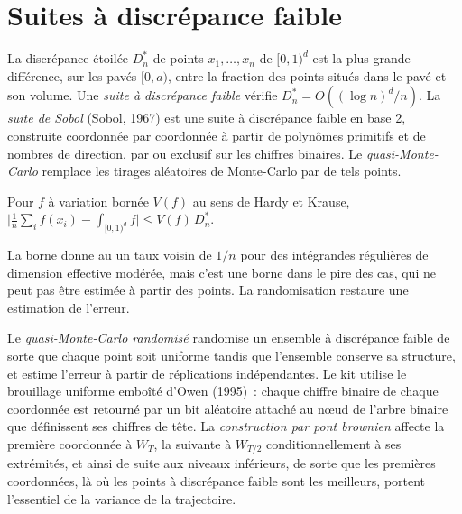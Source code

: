 \section{Suites à discrépance faible}

\begin{definition}\label{def:qm:monte-carlo:qmc}
La discrépance étoilée $D_n^*$ de points $x_1, \dots, x_n$ de $[0, 1)^d$ est la plus grande différence, sur les pavés $[0, a)$, entre la fraction des points situés dans le pavé et son volume. Une \emph{suite à
discrépance faible} vérifie $D_n^* = O((\log n)^d/n)$. La \emph{suite de Sobol} (Sobol, 1967) est une suite à discrépance faible en base 2, construite coordonnée par
coordonnée à partir de polynômes primitifs et de nombres de direction, par ou exclusif sur les chiffres binaires. Le \emph{quasi-Monte-Carlo} remplace les tirages aléatoires de Monte-Carlo par de tels
points.
\end{definition}

\begin{proposition}\label{prop:qm:monte-carlo:kh}
Pour $f$ à variation bornée $V(f)$ au sens de Hardy et Krause, $\bigl|\frac1n\sum_if(x_i) - \int_{[0,1)^d}f\bigr| \le V(f)\,D_n^*$.
\end{proposition}

La borne donne au  un taux voisin de $1/n$ pour des intégrandes régulières de dimension effective modérée, mais c'est une borne dans le pire des cas, qui ne peut pas être estimée à partir des points. La randomisation
restaure une estimation de l'erreur.

\begin{definition}\label{def:qm:monte-carlo:rqmc}
Le \emph{quasi-Monte-Carlo randomisé} randomise un ensemble à discrépance faible de sorte que chaque point soit uniforme tandis que l'ensemble conserve sa structure, et estime l'erreur
à partir de réplications indépendantes. Le kit utilise le brouillage uniforme emboîté d'Owen (1995)~: chaque chiffre binaire de chaque coordonnée est retourné par un bit aléatoire attaché au nœud de l'arbre binaire que définissent ses
chiffres de tête. La \emph{construction par pont brownien} affecte la première coordonnée à $W_T$, la suivante à $W_{T/2}$ conditionnellement à ses extrémités, et ainsi de suite
aux niveaux inférieurs, de sorte que les premières coordonnées, là où les points à discrépance faible sont les meilleurs, portent l'essentiel de la variance de la trajectoire.
\end{definition}

